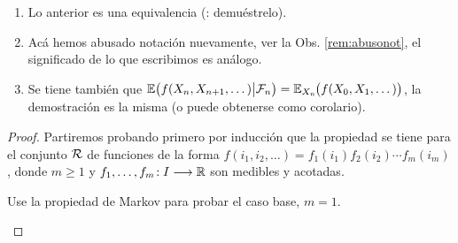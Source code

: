 \begin{rem}
\leavevmode
\begin{enumerate}[label=(\roman*)]
\item Lo anterior es una equivalencia (\uexers{}: demuéstrelo).
\item Acá hemos abusado notación nuevamente, ver la Obs. \ref{rem:abusonot}, el significado de lo que escribimos es análogo.
\item Se tiene también que $\mathbb{E}\big(f(X_{n},X_{n+1},\dotsc)\big|\mathcal{F}_n\big)=\mathbb{E}_{X_n}\hspace{-0.1em}\big(f(X_0,X_1,\dotsc)\big)$, la demostración es la misma (o puede obtenerse como corolario).
\end{enumerate}
\end{rem}

\begin{proof}
Partiremos probando primero por inducción que la propiedad se tiene para el conjunto ${\cal R}$ de funciones de la forma $f(i_1,i_2,\dotsc)=f_1(i_1)f_2(i_2)\dotsm f_m(i_m)$, donde $m\geq1$ y $f_1,\dotsc,f_m\!:I\longrightarrow\mathbb{R}$ son medibles y acotadas.

\begin{exer}
Use la propiedad de Markov para probar el caso base, $m=1$.
\end{exer}


\end{proof}
